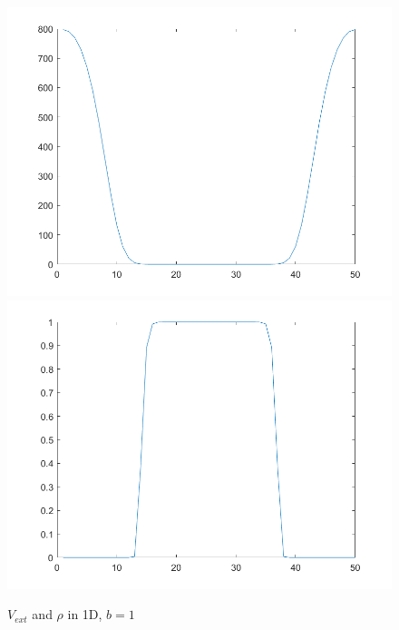 \documentclass[11pt, a4paper]{article}
\theoremstyle{definition}
\begin{document}
	\begin{figure}[h]
		\centering
		\includegraphics[scale=0.25]{Vext1.png}
		\includegraphics[scale=0.25]{rho1.png}
		\caption{$V_{ext}$ and $\rho$ in 1D, $b =1$} 
		\label{F1a}
	\end{figure} 
\end{document}
